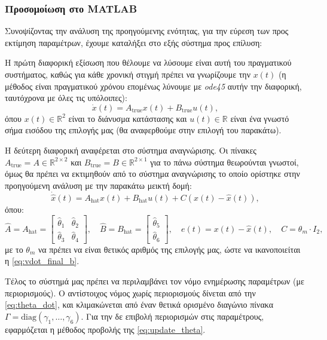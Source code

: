 \documentclass[12pt]{article} %
\numberwithin{equation}{section}  %
\begin{document}
\newpage

\subsubsection{Προσομοίωση στο MATLAB}

Συνοψίζοντας την ανάλυση της προηγούμενης ενότητας, για την εύρεση των προς εκτίμηση παραμέτρων, έχουμε καταλήξει στο εξής σύστημα προς επίλυση:

\noindent\textbullet\hspace{0.2em} Η πρώτη διαφορική εξίσωση που θέλουμε να λύσουμε είναι αυτή του πραγματικού συστήματος, 
καθώς για κάθε χρονική στιγμή πρέπει να γνωρίζουμε την $x(t)$ (η μέθοδος είναι πραγματικού χρόνου επομένως λύνουμε με \textit{ode45} αυτήν την διαφορική, ταυτόχρονα με όλες τις υπόλοιπες):
\begin{equation}
    \dot{x}(t) = A_{\text{true}} x(t) + B_{\text{true}} u(t),
\end{equation}
όπου \( x(t) \in \mathbb{R}^2 \) είναι το διάνυσμα κατάστασης και \( u(t) \in \mathbb{R} \) είναι ένα γνωστό σήμα εισόδου της επιλογής μας (θα αναφερθούμε στην επιλογή του παρακάτω).  

\noindent\textbullet\hspace{0.2em} Η δεύτερη διαφορική αναφέρεται στο σύστημα αναγνώρισης. Οι πίνακες \( A_{\text{true}} = A \in \mathbb{R}^{2 \times 2} \) και \( B_{\text{true}} = B \in \mathbb{R}^{2 \times 1} \) για το πάνω σύστημα θεωρούνται γνωστοί, 
όμως θα πρέπει να εκτιμηθούν από το σύστημα αναγνώρισης το οποίο ορίστηκε στην προηγούμενη ανάλυση με την παρακάτω μεικτή δομή:
\begin{equation}
    \dot{\hat{x}}(t) = A_{\text{hat}} x(t) + B_{\text{hat}} u(t) + C \left( x(t) - \hat{x}(t) \right),
\end{equation}
όπου:
\[
\hat{A} = A_{\text{hat}} = 
\begin{bmatrix}
\hat\theta_1 & \hat\theta_2 \\
\hat\theta_3 & \hat\theta_4
\end{bmatrix}, \quad
\hat{B} = B_{\text{hat}} = 
\begin{bmatrix}
\hat\theta_5 \\
\hat\theta_6
\end{bmatrix}, \quad
e(t) = x(t) - \hat{x}(t), \quad 
C = \theta_{m} \cdot I_2,
\]
με το $\theta_{m}$ να πρέπει να είναι θετικός αριθμός της επιλογής μας, ώστε να ικανοποιείται η \eqref{eq:vdot_final_b}.

\noindent\textbullet\hspace{0.2em} Τέλος το σύστημά μας πρέπει να περιλαμβάνει τον νόμο ενημέρωσης παραμέτρων (με περιορισμούς).
Ο αντίστοιχος νόμος χωρίς περιορισμούς δίνεται από την \eqref{eq:theta_dot}, 
και κλιμακώνεται από έναν θετικά ορισμένο διαγώνιο πίνακα \( \Gamma = \mathrm{diag}(\gamma_1, \ldots, \gamma_6) \).
Για την δε επιβολή περιορισμών στις παραμέτρους, εφαρμόζεται η μέθοδος προβολής της \eqref{eq:update_theta}.
\end{document}
